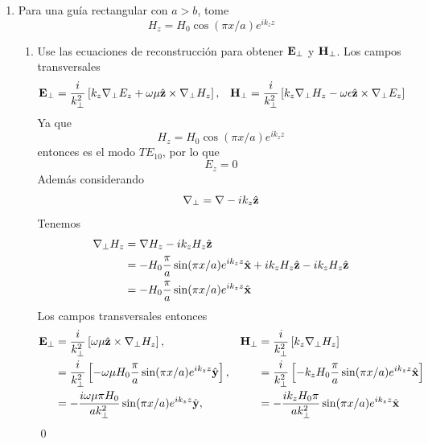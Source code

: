 \documentclass[]{article}
\numberwithin{equation}{section}
\begin{document}
\begin{enumerate}
	\item Para una guía rectangular con $a > b$, tome
	\begin{equation}
		H_z = H_0 \cos(\pi x/a) e ^{i k_z z}
	\end{equation}
	\begin{enumerate}
		\item[(a)] Use las ecuaciones de reconstrucción para obtener $\mathbf{E}_\perp$ y $\mathbf{H}_\perp$.
		\resp Los campos transversales
		\begin{align*}
			\mathbf{E}_\perp &= \frac{i}{k_\perp^2}\left[k_z\nabla_\perp E_z + \omega\mu\hat{\mathbf{z}}\times\nabla_\perp H_z\right], & \mathbf{H}_\perp &= \frac{i}{k_\perp^2}\left[k_z\nabla_\perp H_z - \omega\epsilon\hat{\mathbf{z}}\times\nabla_\perp E_z\right]
		\end{align*}
		Ya que
		\begin{equation*}
			H_z = H_0 \cos(\pi x/a) e ^{i k_z z}
		\end{equation*}
		entonces es el modo ${{T\!E}_{10}}$, por lo que
		\begin{equation*}
			E_z = 0
		\end{equation*}
		Además considerando
		\begin{equation}
			\nabla_\perp = \nabla - i k_z \hat{\mathbf{z}}
		\end{equation}
		Tenemos
		\begin{align*}
			\nabla_\perp H_z &= \nabla H_z - i k_z H_z \hat{\mathbf{z}}\\
			&= - H_0 \frac{\pi}{a} \sin(\pi x/a) e ^{i k_z z}\hat{\mathbf{x}} + i k_z H_z \hat{\mathbf{z}} - i k_z H_z \hat{\mathbf{z}}\\
			&= - H_0 \frac{\pi}{a} \sin(\pi x/a) e ^{i k_z z}\hat{\mathbf{x}}
		\end{align*}
		Los campos transversales entonces
		\begin{align*}
			\mathbf{E}_\perp &= \frac{i}{k_\perp^2}\left[\omega\mu\hat{\mathbf{z}}\times\nabla_\perp H_z\right], & \mathbf{H}_\perp &= \frac{i}{k_\perp^2}\left[k_z\nabla_\perp H_z \right]\\
			&= \frac{i}{k_\perp^2} \left[-\omega\mu  H_0 \frac{\pi}{a} \sin(\pi x/a) e ^{i k_z z} \hat{\mathbf{y}}\right], & &= \frac{i}{k_\perp^2}\left[- k_z H_0 \frac{\pi}{a} \sin(\pi x/a) e ^{i k_z z}\hat{\mathbf{x}} \right]\\
			&= -\frac{i \omega\mu\pi  H_0}{a k_\perp^2} \sin(\pi x/a) e ^{i k_z z} \hat{\mathbf{y}}, & &= -\frac{i k_z H_0 \pi}{a k_\perp^2} \sin(\pi x/a) e ^{i k_z z}\hat{\mathbf{x}}
		\end{align*}
		\qed
		

\end{enumerate}
\end{enumerate}
\end{document}
